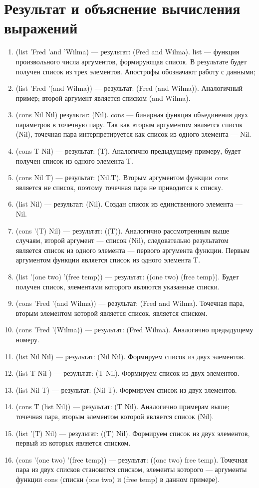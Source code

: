 \documentclass[a4paper, 14pt, unknownkeysallowed]{extreport}
\begin{document}
\section{Результат и объяснение вычисления выражений}
\begin{enumerate}
\item (list 'Fred 'and 'Wilma) --- результат: (Fred and Wilma). list --- функция произвольного числа аргументов, формирующая список. В результате будет получен список из трех элементов. Апострофы обозначают работу с данными;
\item (list 'Fred '(and Wilma)) --- результат: (Fred (and Wilma)). Аналогичный пример; второй аргумент является списком (and Wilma).
\item (cons Nil Nil) результат: (Nil). cons --- бинарная функция объединения двух параметров в точечную пару. Так как вторым аргументом является список (Nil), точечная пара интерпретируется как список из одного элемента --- Nil.
\item (cons T Nil) --- результат: (T). Аналогично предыдущему примеру, будет получен список из одного элемента T.
\item (cons Nil T) --- результат: (Nil.T). Вторым аргументом функции cons является не список, поэтому точечная пара не приводится к списку.
\item (list Nil) --- результат: (Nil). Создан список из единственного элемента --- Nil.
\item (cons '(T) Nil) --- результат: ((T)). Аналогично рассмотренным выше случаям, второй аргумент --- список (Nil), следовательно результатом является список из одного элемента --- первого аргумента функции. Первым аргументом функции является список из одного элемента T.
\item (list '(one two) '(free temp)) --- результат: ((one two) (free temp)). Будет получен список, элементами которого являются указанные списки.
\item (cons 'Fred '(and Wilma)) --- результат: (Fred and Wilma). Точечная пара, вторым элементом которой является список, является списком.
\item (cons 'Fred '(Wilma)) --- результат: (Fred Wilma). Аналогично предыдущему номеру.
\item (list Nil Nil) --- результат: (Nil Nil). Формируем список из двух элементов.
\item (list T Nil ) --- результат: (T Nil). Формируем список из двух элементов.
\item (list Nil T) --- результат: (Nil T). Формируем список из двух элементов.
\item (cons T (list Nil)) --- результат: (T Nil). Аналогично примерам выше; точечная пара, вторым элементом которой является список (Nil).
\item (list '(T) Nil) --- результат: ((T) Nil). Формируем список из двух элементов, первый из которых является списком.
\item (cons '(one two) '(free temp)) --- результат: ((one two) free temp). Точечная пара из двух списков становится списком, элементы которого --- аргументы функции cons (списки (one two) и (free temp) в данном примере).
\end{enumerate}
\end{document}
